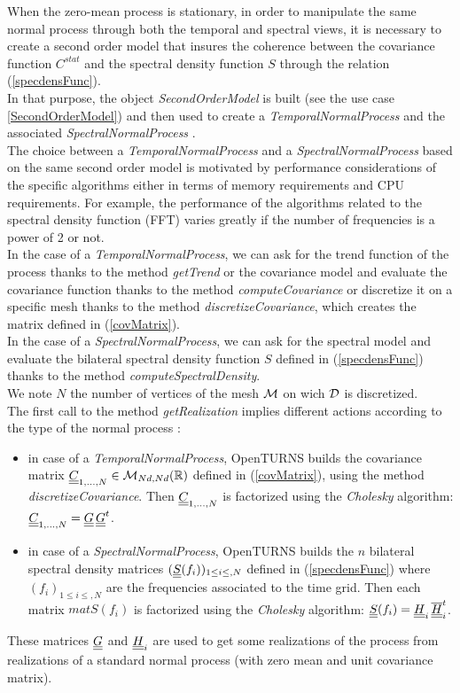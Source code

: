 When the zero-mean process is stationary, in order to manipulate the same normal process through both the temporal and spectral views, it is necessary to create a second order model that insures the coherence between the covariance function $C^{stat}$  and the spectral density function $S$ through the relation (\ref{specdensFunc}). \\
In that purpose, the object {\itshape SecondOrderModel} is built (see the use case \ref{SecondOrderModel}) and then used to create a {\itshape TemporalNormalProcess} and the associated {\itshape SpectralNormalProcess} .\\
The choice between a {\itshape TemporalNormalProcess} and a {\itshape SpectralNormalProcess}  based on the same second order model is motivated by performance considerations of the specific algorithms either in terms of memory requirements and CPU requirements. For example, the performance of the algorithms related to the spectral density function (FFT) varies greatly if the number of frequencies is a power of 2 or not.\\

In the case of a {\itshape TemporalNormalProcess}, we can ask for the trend function of the process thanks to the method \emph{getTrend} or the covariance model and evaluate the covariance function  thanks to the method \emph{computeCovariance} or discretize  it on a specific mesh thanks to the method \emph{discretizeCovariance}, which creates the matrix defined in (\ref{covMatrix}).\\
In the case of a {\itshape SpectralNormalProcess}, we can ask for the spectral model and evaluate the bilateral spectral density function $S$ defined in (\ref{specdensFunc}) thanks to the method \emph{computeSpectralDensity}.\\

We note $N$ the number of vertices of the mesh ${\mathcal M}$ on wich ${\mathcal D}$ is discretized.\\
The first call to the method \emph{getRealization} implies different actions according to the type of the   normal process :
\begin{itemize}
\item in case of a {\itshape TemporalNormalProcess}, OpenTURNS builds the covariance matrix ${\underline{\underline{C}}}_{1,\dots,N} \in \mathcal{M}_{Nd,Nd}({\mathbb R}     )$ defined in (\ref{covMatrix}), using the  method \emph{discretizeCovariance}. Then ${\underline{\underline{C}}}_{1,\dots,N}$ is factorized using the \emph{Cholesky} algorithm:  ${\underline{\underline{C}}}_{1,\dots,N} = {\underline{\underline{G}}} \, {\underline{\underline{G}}}^{t}$.
\item in case of a {\itshape SpectralNormalProcess}, OpenTURNS builds the $n$ bilateral spectral density matrices $({\underline{\underline{S}}}(f_i))_{1 \leq i \leq,N}$ defined in (\ref{specdensFunc}) where $(f_i)_{1 \leq i \leq,N}$ are the frequencies associated to the time grid. Then each matrix $mat{S}(f_i)$ is factorized using the \emph{Cholesky} algorithm:  ${\underline{\underline{S}}}(f_i) = {\underline{\underline{H}}}_i \, \overline{{\underline{\underline{H}}}}_i^{t}$.
\end{itemize}
These matrices ${\underline{\underline{G}}}$ and ${\underline{\underline{H}}}_i$ are used to get some realizations of the process from realizations of a standard normal process (with zero mean and unit covariance matrix). \\

